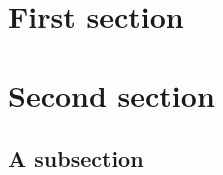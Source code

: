 \section{First section}
\lipsum[1]
\lipsum[2]
\lipsum[3]

\section{Second section}
\lipsum[4]
\lipsum[5]

\subsection{A subsection}
\lipsum[6]
